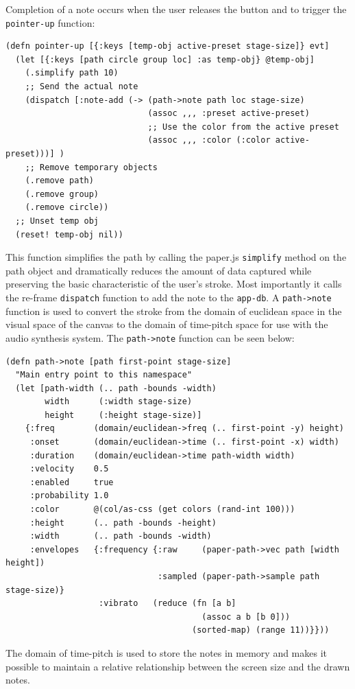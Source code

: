 \documentclass[12pt]{report}
\begin{document}
Completion of a note occurs when the user releases the button and to trigger the
\texttt{pointer-up} function:
\begin{footnotesize}
\begin{verbatim}
(defn pointer-up [{:keys [temp-obj active-preset stage-size]} evt]
  (let [{:keys [path circle group loc] :as temp-obj} @temp-obj]
    (.simplify path 10)
    ;; Send the actual note
    (dispatch [:note-add (-> (path->note path loc stage-size)
                             (assoc ,,, :preset active-preset)
                             ;; Use the color from the active preset
                             (assoc ,,, :color (:color active-preset)))] )
    ;; Remove temporary objects
    (.remove path)
    (.remove group)
    (.remove circle))
  ;; Unset temp obj
  (reset! temp-obj nil))
\end{verbatim}
\end{footnotesize}
This function simplifies the path by calling the paper.js \texttt{simplify} method on
the path object and dramatically reduces the amount of data captured while
preserving the basic characteristic of the user's stroke. Most importantly it
calls the re-frame \texttt{dispatch} function to add the note to the \texttt{app-db}. A
\texttt{path->note} function is used to convert the stroke from the domain of euclidean
space in the visual space of the canvas to the domain of time-pitch space for
use with the audio synthesis system. The \texttt{path->note} function can be seen below:
\begin{footnotesize}
\begin{verbatim}
(defn path->note [path first-point stage-size]
  "Main entry point to this namespace"
  (let [path-width (.. path -bounds -width)
        width      (:width stage-size)
        height     (:height stage-size)]
    {:freq        (domain/euclidean->freq (.. first-point -y) height)
     :onset       (domain/euclidean->time (.. first-point -x) width)
     :duration    (domain/euclidean->time path-width width)
     :velocity    0.5
     :enabled     true
     :probability 1.0
     :color       @(col/as-css (get colors (rand-int 100)))
     :height      (.. path -bounds -height)
     :width       (.. path -bounds -width)
     :envelopes   {:frequency {:raw     (paper-path->vec path [width height])
                               :sampled (paper-path->sample path stage-size)}
                   :vibrato   (reduce (fn [a b]
                                        (assoc a b [b 0]))
                                      (sorted-map) (range 11))}}))
\end{verbatim}
\end{footnotesize}
The domain of time-pitch is used to store the notes in memory and makes it
possible to maintain a relative relationship between the screen size and the
drawn notes.
\end{document}
